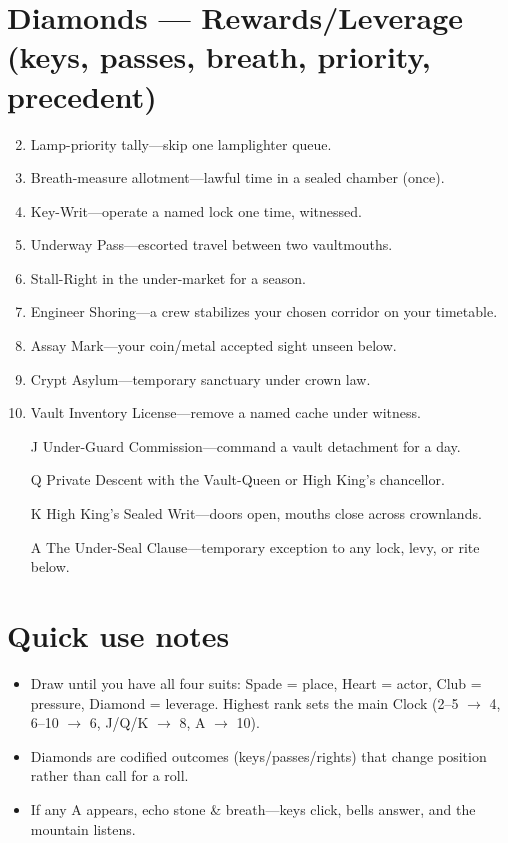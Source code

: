 \section*{Diamonds --- Rewards/Leverage (keys, passes, breath, priority, precedent)}
\begin{enumerate}
\setcounter{enumi}{1}
\item Lamp-priority tally---skip one lamplighter queue.
\item Breath-measure allotment---lawful time in a sealed chamber (once).
\item Key-Writ---operate a named lock one time, witnessed.
\item Underway Pass---escorted travel between two vaultmouths.
\item Stall-Right in the under-market for a season.
\item Engineer Shoring---a crew stabilizes your chosen corridor on your timetable.
\item Assay Mark---your coin/metal accepted sight unseen below.
\item Crypt Asylum---temporary sanctuary under crown law.
\item Vault Inventory License---remove a named cache under witness.
\item[J] Under-Guard Commission---command a vault detachment for a day.
\item[Q] Private Descent with the Vault-Queen or High King's chancellor.
\item[K] High King's Sealed Writ---doors open, mouths close across crownlands.
\item[A] The Under-Seal Clause---temporary exception to any lock, levy, or rite below.
\end{enumerate}

\section*{Quick use notes}
\begin{itemize}
\item Draw until you have all four suits: Spade = place, Heart = actor, Club = pressure, Diamond = leverage. Highest rank sets the main Clock (2--5 $\rightarrow$ 4, 6--10 $\rightarrow$ 6, J/Q/K $\rightarrow$ 8, A $\rightarrow$ 10).
\item Diamonds are codified outcomes (keys/passes/rights) that change position rather than call for a roll.
\item If any A appears, echo stone \& breath---keys click, bells answer, and the mountain listens.
\end{itemize}
